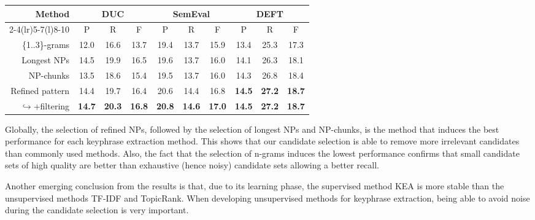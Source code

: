       \begin{table*}
        \centering
        \begin{tabular}{@{}rccccccccc@{}}
          \toprule
          \multirow{2}{*}[-2pt]{\textbf{Method}} & \multicolumn{3}{c}{\textbf{DUC}} & \multicolumn{3}{c}{\textbf{SemEval}} & \multicolumn{3}{c}{\textbf{DEFT}}\\
          \cmidrule(r){2-4}\cmidrule(lr){5-7}\cmidrule(l){8-10}
          & P & R & F & P & R & F & P & R & F\\
          \midrule
          \{1..3\}-grams & 12.0 & 16.6 & 13.7 & 19.4 & 13.7 & 15.9 & 13.4 & 25.3 & 17.3\\
          Longest NPs & 14.5 & 19.9 & 16.5 & 19.6 & 13.7 & 16.0 & 14.1 & 26.3 & 18.1\\
          NP-chunks & 13.5 & 18.6 & 15.4 & 19.5 & 13.7 & 16.0 & 14.3 & 26.8 & 18.4\\
          Refined pattern & 14.4 & 19.7 & 16.4 & 20.6 & 14.4 & 16.8 & \textbf{14.5} & \textbf{27.2} & \textbf{18.7}\\
          $\hookrightarrow$\hfill{}+filtering & \textbf{14.7} & \textbf{20.3} & \textbf{16.8} & \textbf{20.8} & \textbf{14.6} & \textbf{17.0}& \textbf{14.5} & \textbf{27.2} & \textbf{18.7}\\
          \bottomrule
        \end{tabular}
        \caption{Comparison of candidate selection methods, when 10 keyphrases
                 are extracted by \textbf{KEA}.
                 \label{tab:kea_results}}
      \end{table*}
      
      Globally, the selection of refined NPs, followed by the selection of
      longest NPs and NP-chunks, is the method that induces the best performance
      for each keyphrase extraction method. This shows that our candidate
      selection is able to remove more irrelevant candidates than commonly used
      methods. Also, the fact that the selection of n-grams induces the lowest
      performance confirms that small candidate sets of high quality are better
      than exhaustive (hence noisy) candidate sets allowing a better recall.
      
      Another emerging conclusion from the results is that, due to its
      learning phase, the supervised method KEA is more stable than the
      unsupervised methods TF-IDF and TopicRank. When developing unsupervised
      methods for keyphrase extraction, being able to avoid noise during the
      candidate selection is very important.

